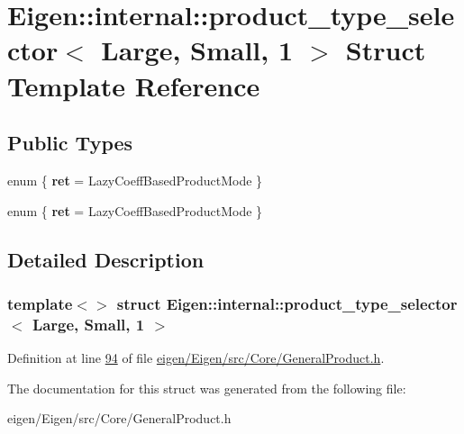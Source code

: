 \hypertarget{struct_eigen_1_1internal_1_1product__type__selector_3_01_large_00_01_small_00_011_01_4}{}\section{Eigen\+:\+:internal\+:\+:product\+\_\+type\+\_\+selector$<$ Large, Small, 1 $>$ Struct Template Reference}
\label{struct_eigen_1_1internal_1_1product__type__selector_3_01_large_00_01_small_00_011_01_4}
\subsection*{Public Types}
\begin{DoxyCompactItemize}
\item 
\mbox{\label{struct_eigen_1_1internal_1_1product__type__selector_3_01_large_00_01_small_00_011_01_4_a34eca9590f3653b3d8901b9c8621259c}} 
enum \{ {\bfseries ret} = Lazy\+Coeff\+Based\+Product\+Mode
 \}
\item 
\mbox{\label{struct_eigen_1_1internal_1_1product__type__selector_3_01_large_00_01_small_00_011_01_4_abdba81d547b60b82437d29703b56c32f}} 
enum \{ {\bfseries ret} = Lazy\+Coeff\+Based\+Product\+Mode
 \}
\end{DoxyCompactItemize}


\subsection{Detailed Description}
\subsubsection*{template$<$$>$\newline
struct Eigen\+::internal\+::product\+\_\+type\+\_\+selector$<$ Large, Small, 1 $>$}



Definition at line \hyperlink{eigen_2_eigen_2src_2_core_2_general_product_8h_source_l00094}{94} of file \hyperlink{eigen_2_eigen_2src_2_core_2_general_product_8h_source}{eigen/\+Eigen/src/\+Core/\+General\+Product.\+h}.



The documentation for this struct was generated from the following file\+:\begin{DoxyCompactItemize}
\item 
eigen/\+Eigen/src/\+Core/\+General\+Product.\+h\end{DoxyCompactItemize}
